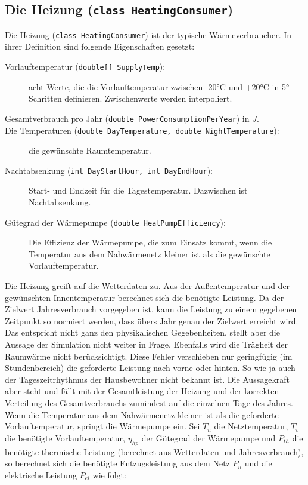 \documentclass[12pt,a4paper]{article}
\begin{document}
\subsection{Die Heizung (\texttt{class HeatingConsumer})}
Die Heizung (\texttt{class HeatingConsumer}) ist der typische Wärmeverbraucher. In ihrer Definition sind folgende Eigenschaften gesetzt:
\begin{description}
\item[Vorlauftemperatur (\texttt{double[] SupplyTemp}):] acht Werte, die die Vorlauftemperatur zwischen -20°C und +20°C in 5° Schritten definieren. Zwischenwerte werden interpoliert.
\item[Gesamtverbrauch pro Jahr (\texttt{double PowerConsumptionPerYear}) in $J$.]
\item[Die Temperaturen (\texttt{double DayTemperature, double NightTemperature}):] die gewünschte Raumtemperatur.
\item[Nachtabsenkung (\texttt{int DayStartHour, int DayEndHour}):]
 Start- und Endzeit für die Tagestemperatur. Dazwischen ist Nachtabsenkung.
\item[Gütegrad der Wärmepumpe (\texttt{double HeatPumpEfficiency}):]
Die Effizienz der Wärmepumpe, die zum Einsatz kommt, wenn die Temperatur aus dem Nahwärmenetz kleiner ist als die gewünschte Vorlauftemperatur.
\end{description}
Die Heizung greift auf die Wetterdaten zu. Aus der Außentemperatur und der gewünschten Innentemperatur berechnet sich die benötigte Leistung. Da der Zielwert Jahresverbrauch vorgegeben ist, kann die Leistung zu einem gegebenen Zeitpunkt so normiert werden, dass übers Jahr genau der Zielwert erreicht wird. Das entspricht nicht ganz den physikalischen Gegebenheiten, stellt aber die Aussage der Simulation nicht weiter in Frage. Ebenfalls wird die Trägheit der Raumwärme nicht berücksichtigt. Diese Fehler verschieben nur geringfügig (im Stundenbereich) die geforderte Leistung nach vorne oder hinten. So wie ja auch der Tageszeitrhythmus der Hausbewohner nicht bekannt ist. Die Aussagekraft aber steht und fällt mit der Gesamtleistung der Heizung und der korrekten Verteilung des Gesamtverbrauchs zumindest auf die einzelnen Tage des Jahres.\\
Wenn die Temperatur aus dem Nahwärmenetz kleiner ist als die geforderte Vorlauftemperatur, springt die Wärmepumpe ein.
Sei $T_{n}$ die Netztemperatur, $T_{v}$ die benötigte Vorlauftemperatur, $\eta_{hp}$ der Gütegrad der Wärmepumpe und $P_{th}$ die benötigte thermische Leistung (berechnet aus Wetterdaten und Jahresverbrauch), so berechnet sich die benötigte Entzugsleistung aus dem Netz $P_{n}$ und die elektrische Leistung $P_{el}$ wie folgt:
\end{document}
